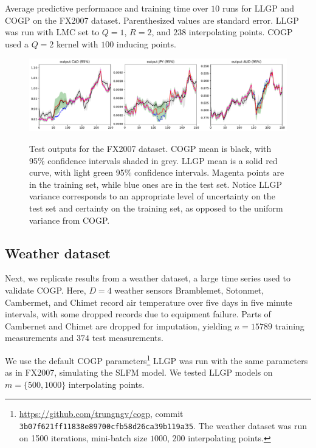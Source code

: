 \documentclass{article}
\begin{document}
\begin{table}[!h]
  \caption{Average predictive performance and training time over $10$ runs for LLGP and COGP on the FX2007 dataset. Parenthesized values are standard error. LLGP was run with LMC set to $Q=1$, $R=2$, and $238$ interpolating points. COGP used a $Q=2$ kernel with $100$ inducing points.}
\label{fx2007-tbl}
\begin{center}
  \begin{small}
    \begin{sc}
      
\end{sc}
\end{small}
\end{center}
\end{table}

\begin{figure}[!h]
\centering
{\includegraphics[width=\textwidth]{fx2007graph.pdf}}
\caption{Test outputs for the FX2007 dataset. COGP mean is black, with 95\% confidence intervals shaded in grey. LLGP mean is a solid red curve, with light green 95\% confidence intervals. Magenta points are in the training set, while blue ones are in the test set. Notice LLGP variance corresponds to an appropriate level of uncertainty on the test set and certainty on the training set, as opposed to the uniform variance from COGP.}
\label{fx2007-graph}
\end{figure}

\subsection{Weather dataset}\label{large-bench}

Next, we replicate results from a weather dataset, a large time series used to validate COGP. Here, $D=4$ weather sensors Bramblemet, Sotonmet, Cambermet, and Chimet record air temperature over five days in five minute intervals, with some dropped records due to equipment failure. Parts of Cambernet and Chimet are dropped for imputation, yielding $n=15789$ training measurements and $374$ test measurements. 

We use the default COGP parameters\footnote{\url{https://github.com/trungngv/cogp}, commit \texttt{3b07f621ff11838e89700cfb58d26ca39b119a35}. The weather dataset was run on 1500 iterations, mini-batch size $1000$, $200$ interpolating points.} LLGP was run with the same parameters as in FX2007, simulating the SLFM model. We tested LLGP models on $m=\{500, 1000\}$ interpolating points.
\end{document}
